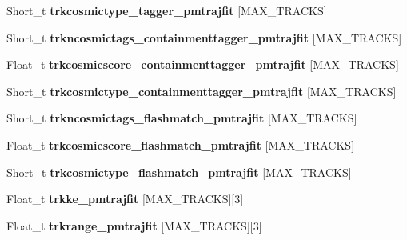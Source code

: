\begin{DoxyCompactItemize}
\item 
\hypertarget{classanatree_a3a0d3b5fb1121118014b0d2a8387ba6a}{Short\-\_\-t {\bfseries trkcosmictype\-\_\-tagger\-\_\-pmtrajfit} \mbox{[}M\-A\-X\-\_\-\-T\-R\-A\-C\-K\-S\mbox{]}}\label{classanatree_a3a0d3b5fb1121118014b0d2a8387ba6a}

\item 
\hypertarget{classanatree_a945d06e2aea5a57ae7600e817bc63d0f}{Short\-\_\-t {\bfseries trkncosmictags\-\_\-containmenttagger\-\_\-pmtrajfit} \mbox{[}M\-A\-X\-\_\-\-T\-R\-A\-C\-K\-S\mbox{]}}\label{classanatree_a945d06e2aea5a57ae7600e817bc63d0f}

\item 
\hypertarget{classanatree_a6ee81f915805ae5633a43b086caae9f2}{Float\-\_\-t {\bfseries trkcosmicscore\-\_\-containmenttagger\-\_\-pmtrajfit} \mbox{[}M\-A\-X\-\_\-\-T\-R\-A\-C\-K\-S\mbox{]}}\label{classanatree_a6ee81f915805ae5633a43b086caae9f2}

\item 
\hypertarget{classanatree_a7d9cde811e1a0d9d10fa4ac1994c0bdc}{Short\-\_\-t {\bfseries trkcosmictype\-\_\-containmenttagger\-\_\-pmtrajfit} \mbox{[}M\-A\-X\-\_\-\-T\-R\-A\-C\-K\-S\mbox{]}}\label{classanatree_a7d9cde811e1a0d9d10fa4ac1994c0bdc}

\item 
\hypertarget{classanatree_ae7727401f92f393835e0334fc0850c92}{Short\-\_\-t {\bfseries trkncosmictags\-\_\-flashmatch\-\_\-pmtrajfit} \mbox{[}M\-A\-X\-\_\-\-T\-R\-A\-C\-K\-S\mbox{]}}\label{classanatree_ae7727401f92f393835e0334fc0850c92}

\item 
\hypertarget{classanatree_aecde2939d264e5639b7c8e42c8a16a1c}{Float\-\_\-t {\bfseries trkcosmicscore\-\_\-flashmatch\-\_\-pmtrajfit} \mbox{[}M\-A\-X\-\_\-\-T\-R\-A\-C\-K\-S\mbox{]}}\label{classanatree_aecde2939d264e5639b7c8e42c8a16a1c}

\item 
\hypertarget{classanatree_a89eb9920378b0313fbf2d039b42775f9}{Short\-\_\-t {\bfseries trkcosmictype\-\_\-flashmatch\-\_\-pmtrajfit} \mbox{[}M\-A\-X\-\_\-\-T\-R\-A\-C\-K\-S\mbox{]}}\label{classanatree_a89eb9920378b0313fbf2d039b42775f9}

\item 
\hypertarget{classanatree_a94f1ca3c3ca4622536802ffc7384bf37}{Float\-\_\-t {\bfseries trkke\-\_\-pmtrajfit} \mbox{[}M\-A\-X\-\_\-\-T\-R\-A\-C\-K\-S\mbox{]}\mbox{[}3\mbox{]}}\label{classanatree_a94f1ca3c3ca4622536802ffc7384bf37}

\item 
\hypertarget{classanatree_afab9c71811a62f2f898df45a87ed3ecd}{Float\-\_\-t {\bfseries trkrange\-\_\-pmtrajfit} \mbox{[}M\-A\-X\-\_\-\-T\-R\-A\-C\-K\-S\mbox{]}\mbox{[}3\mbox{]}}\label{classanatree_afab9c71811a62f2f898df45a87ed3ecd}


\end{DoxyCompactItemize}
